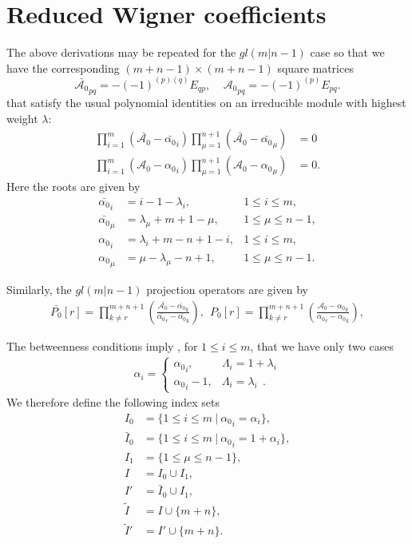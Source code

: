 \documentclass[12pt]{article}
\def\nn{\nonumber}
\begin{document}

\section{Reduced Wigner coefficients} 
\label{Wigner}
The above derivations may be repeated for the $gl(m|n-1)$ case so that we have the corresponding $(m+n-1) \times (m+n-1)$ square matrices
$$
\bar{\mathcal{A}_0}_{pq} = -(-1)^{(p)(q)} E_{qp}, ~~~~~{\mathcal{A}_0}_{pq} = -(-1)^{(p)} E_{pq}.
$$
that satisfy the usual polynomial identities on an irreducible module with highest weight $\lambda$:
\begin{align*}
\prod_{i=1}^m (\bar{\mathcal{A}_0} - \bar{\alpha_0}_i) \prod^{n+1}_{\mu = 1} (\bar{\mathcal{A}_0} - \bar{\alpha_0}_\mu) &= 0 \\
	\prod^m_{i=1} (\mathcal{A}_0 - {\alpha_0}_i ) \prod^{n+1}_{\mu=1} (\mathcal{A}_0 - {\alpha_0}_\mu) &= 0 .
\end{align*}
Here the roots are given by
\begin{align*}
\bar{\alpha_0}_i  &= i - 1 -{\lambda}_i , &1\leq i\leq m, \\
\bar{\alpha_0}_\mu &= {\lambda}_\mu + m + 1 - \mu,  &1\leq \mu \leq n - 1, \\
{\alpha_0}_i &= {\lambda}_i + m - n + 1 - i, &1\leq i\leq m, \\
{\alpha_0}_\mu &= \mu-{\lambda}_\mu - n + 1, &1\leq \mu \leq n - 1.  
\end{align*}

Similarly, the $gl(m|n-1)$ projection operators are given by
\begin{align}
\bar{P_0}[r] = \prod_{k\neq r}^{m+n+1}\left( \frac{\bar{\mathcal{A}_0}  -\bar{\alpha_0}_k}{\bar{\alpha_0}_r - \bar{\alpha_0}_k} \right),
\ \ 
P_0[r] = \prod_{k\neq r}^{m+n+1}\left( 
\frac{\mathcal{A}_0-{\alpha_0}_k}
{{\alpha_0}_r-{\alpha_0}_k} \right),
\end{align}

The betweenness conditions imply 
\cite{GIW1}, for $1\leq i\leq m$, that we have only two cases
\begin{align}
\alpha_i = \left\{ \begin{array}{rl} {\alpha_0}_i,& \Lambda_i = 1+\lambda_i\\
                                    {\alpha_0}_i - 1,& \Lambda_i = \lambda_i  ~~.
\end{array} \right.
\nn
\end{align}
We therefore define the following index sets
\begin{align}
I_0 &=  \{ 1\leq i\leq m\ |\ {\alpha_0}_i=\alpha_i\},\nn\\
\bar{I}_0 &=  \{ 1\leq i\leq m\ |\ {\alpha_0}_i=1+\alpha_i\},\nn\\
I_1 &= \{ 1\leq\mu\leq n-1\},\nn\\
I &= I_0\cup I_1,\nn\\
I'&= \bar{I}_0\cup I_1,\nn\\
\tilde{I} &= I\cup \{m+n\},\nn\\
\tilde{I}' &= I'\cup \{m+n\}.
\label{DefIndexSets} 
\end{align}
\end{document}
